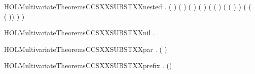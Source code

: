 \newcommand{\HOLMultivariateTheoremsCCSXXSUBSTXXISXXPROC}{\UseVerbatim{HOLMultivariateTheoremsCCSXXSUBSTXXISXXPROC}}
\begin{SaveVerbatim}{HOLMultivariateTheoremsCCSXXSUBSTXXnested}
\HOLTokenTurnstile{} \HOLSymConst{\HOLTokenForall{}}   .
         \HOLSymConst{\HOLTokenConj{}} (  \HOLSymConst{=}  ) \HOLSymConst{\HOLTokenConj{}}
       (  \HOLSymConst{=}  ) \HOLSymConst{\HOLTokenConj{}}  ( ) ( ) \HOLSymConst{\HOLTokenImp{}}
       ( ( \HOLSymConst{\HOLTokenMapto{}} ) ( ( \HOLSymConst{\HOLTokenMapto{}} ) ) \HOLSymConst{=}
         ( \HOLSymConst{\HOLTokenMapto{}}  ( ( \HOLSymConst{\HOLTokenMapto{}} )) ) )
\end{SaveVerbatim}
\newcommand{\HOLMultivariateTheoremsCCSXXSUBSTXXnested}{\UseVerbatim{HOLMultivariateTheoremsCCSXXSUBSTXXnested}}
\begin{SaveVerbatim}{HOLMultivariateTheoremsCCSXXSUBSTXXnil}
\HOLTokenTurnstile{} \HOLSymConst{\HOLTokenForall{}}.    \HOLSymConst{=} 
\end{SaveVerbatim}
\newcommand{\HOLMultivariateTheoremsCCSXXSUBSTXXnil}{\UseVerbatim{HOLMultivariateTheoremsCCSXXSUBSTXXnil}}
\begin{SaveVerbatim}{HOLMultivariateTheoremsCCSXXSUBSTXXpar}
\HOLTokenTurnstile{} \HOLSymConst{\HOLTokenForall{}}  .
         ( \HOLSymConst{\ensuremath{\parallel}} ) \HOLSymConst{=}
          \HOLSymConst{\ensuremath{\parallel}}   
\end{SaveVerbatim}
\newcommand{\HOLMultivariateTheoremsCCSXXSUBSTXXpar}{\UseVerbatim{HOLMultivariateTheoremsCCSXXSUBSTXXpar}}
\begin{SaveVerbatim}{HOLMultivariateTheoremsCCSXXSUBSTXXprefix}
\HOLTokenTurnstile{} \HOLSymConst{\HOLTokenForall{}}  .   () \HOLSymConst{=}   
\end{SaveVerbatim}
